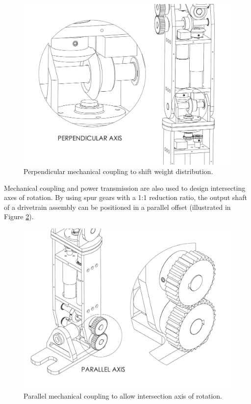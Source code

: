\begin{figure}[!h]
	\begin{center}
    \includegraphics[scale=0.5]{fig/design/perpendicular.pdf}
	\end{center}
  \caption{Perpendicular mechanical coupling to shift weight distribution.}
\label{fig:miter}
\end{figure}

Mechanical coupling and power transmission are also used to design  intersecting axes of rotation. By using spur gears with a 1:1 reduction ratio, the output shaft of a drivetrain assembly can be positioned in a parallel offset (illustrated in Figure \ref{fig:spur}).

\begin{figure}[!h]	
	\begin{center}
    \includegraphics[scale=0.5]{fig/design/parallel.pdf}
	\end{center}
  \caption{Parallel mechanical coupling to allow intersection axis of rotation.}
\label{fig:spur}
\end{figure}

